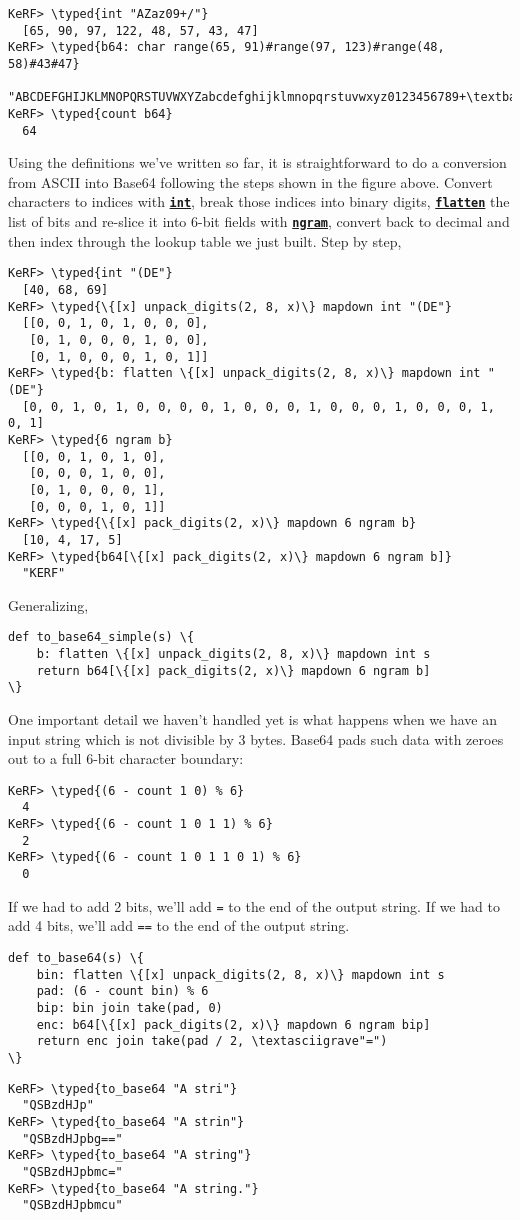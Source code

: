 \documentclass{article}
\newcommand{\typed}[1]{\textcolor{TealBlue}{#1}}
\newcommand{\primu}[2]{\hyperref[prim:#2]{\textbf{\texttt{#1}}}}
\newcommand{\prim}[1]{\primu{#1}{#1}}
\begin{document}
\begin{Verbatim}
KeRF> \typed{int "AZaz09+/"}
  [65, 90, 97, 122, 48, 57, 43, 47]
KeRF> \typed{b64: char range(65, 91)#range(97, 123)#range(48, 58)#43#47}
  "ABCDEFGHIJKLMNOPQRSTUVWXYZabcdefghijklmnopqrstuvwxyz0123456789+\textbackslash/"
KeRF> \typed{count b64}
  64
\end{Verbatim}

Using the definitions we've written so far, it is straightforward to do a conversion from ASCII into Base64 following the steps shown in the figure above. Convert characters to indices with \prim{int}, break those indices into binary digits, \prim{flatten} the list of bits and re-slice it into 6-bit fields with \prim{ngram}, convert back to decimal and then index through the lookup table we just built. Step by step,
\begin{Verbatim}
KeRF> \typed{int "(DE"}
  [40, 68, 69]
KeRF> \typed{\{[x] unpack_digits(2, 8, x)\} mapdown int "(DE"}
  [[0, 0, 1, 0, 1, 0, 0, 0], 
   [0, 1, 0, 0, 0, 1, 0, 0], 
   [0, 1, 0, 0, 0, 1, 0, 1]]
KeRF> \typed{b: flatten \{[x] unpack_digits(2, 8, x)\} mapdown int "(DE"}
  [0, 0, 1, 0, 1, 0, 0, 0, 0, 1, 0, 0, 0, 1, 0, 0, 0, 1, 0, 0, 0, 1, 0, 1]
KeRF> \typed{6 ngram b}
  [[0, 0, 1, 0, 1, 0], 
   [0, 0, 0, 1, 0, 0], 
   [0, 1, 0, 0, 0, 1], 
   [0, 0, 0, 1, 0, 1]]
KeRF> \typed{\{[x] pack_digits(2, x)\} mapdown 6 ngram b}
  [10, 4, 17, 5]
KeRF> \typed{b64[\{[x] pack_digits(2, x)\} mapdown 6 ngram b]}
  "KERF"
\end{Verbatim}

Generalizing,
\begin{Verbatim}
def to_base64_simple(s) \{
	b: flatten \{[x] unpack_digits(2, 8, x)\} mapdown int s
	return b64[\{[x] pack_digits(2, x)\} mapdown 6 ngram b]
\}
\end{Verbatim}

\pagebreak
One important detail we haven't handled yet is what happens when we have an input string which is not divisible by 3 bytes. Base64 pads such data with zeroes out to a full 6-bit character boundary:
\begin{Verbatim}
KeRF> \typed{(6 - count 1 0) % 6}
  4
KeRF> \typed{(6 - count 1 0 1 1) % 6}
  2
KeRF> \typed{(6 - count 1 0 1 1 0 1) % 6}
  0
\end{Verbatim}

 If we had to add 2 bits, we'll add \texttt{=} to the end of the output string. If we had to add 4 bits, we'll add \texttt{==} to the end of the output string.
\begin{Verbatim}
def to_base64(s) \{
	bin: flatten \{[x] unpack_digits(2, 8, x)\} mapdown int s
	pad: (6 - count bin) % 6
	bip: bin join take(pad, 0)
	enc: b64[\{[x] pack_digits(2, x)\} mapdown 6 ngram bip]
	return enc join take(pad / 2, \textasciigrave"=")
\}
\end{Verbatim}
\begin{Verbatim}
KeRF> \typed{to_base64 "A stri"}
  "QSBzdHJp"
KeRF> \typed{to_base64 "A strin"}
  "QSBzdHJpbg=="
KeRF> \typed{to_base64 "A string"}
  "QSBzdHJpbmc="
KeRF> \typed{to_base64 "A string."}
  "QSBzdHJpbmcu"
\end{Verbatim}
\end{document}
